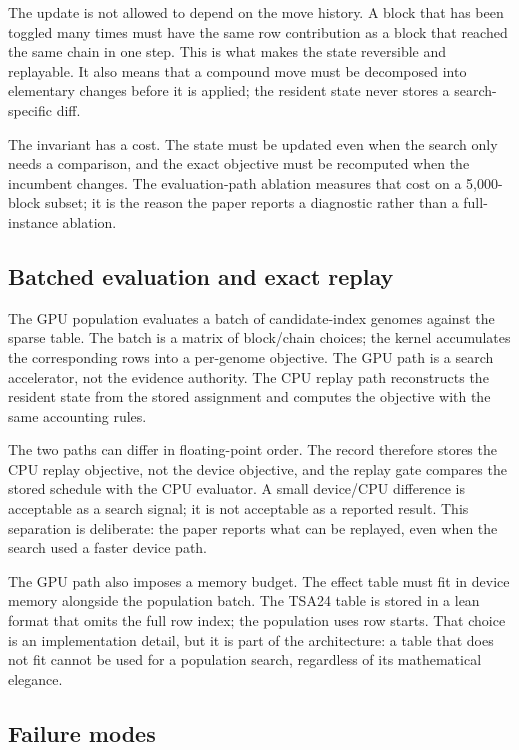 \documentclass[11pt]{article}
\begin{document}
The update is not allowed to depend on the move history. A block that has been toggled many times must
have the same row contribution as a block that reached the same chain in one step. This is what makes
the state reversible and replayable. It also means that a compound move must be decomposed into
elementary changes before it is applied; the resident state never stores a search-specific diff.

The invariant has a cost. The state must be updated even when the search only needs a comparison, and
the exact objective must be recomputed when the incumbent changes. The evaluation-path ablation
measures that cost on a 5,000-block subset; it is the reason the paper reports a diagnostic rather
than a full-instance ablation.

\subsection{Batched evaluation and exact replay}

The GPU population evaluates a batch of candidate-index genomes against the sparse table. The batch is
a matrix of block/chain choices; the kernel accumulates the corresponding rows into a per-genome
objective. The GPU path is a search accelerator, not the evidence authority. The CPU replay path
reconstructs the resident state from the stored assignment and computes the objective with the same
accounting rules.

The two paths can differ in floating-point order. The record therefore stores the CPU replay objective,
not the device objective, and the replay gate compares the stored schedule with the CPU evaluator. A
small device/CPU difference is acceptable as a search signal; it is not acceptable as a reported
result. This separation is deliberate: the paper reports what can be replayed, even when the search
used a faster device path.

The GPU path also imposes a memory budget. The effect table must fit in device memory alongside the
population batch. The TSA24 table is stored in a lean format that omits the full row index; the
population uses row starts. That choice is an implementation detail, but it is part of the architecture:
a table that does not fit cannot be used for a population search, regardless of its mathematical
elegance.

\subsection{Failure modes}
\end{document}
